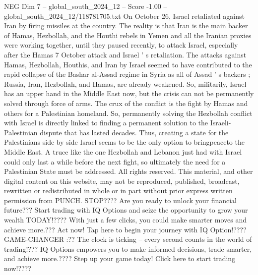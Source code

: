 \begin{textsample}{NEG Dim 7 – global\_south\_2024\_12 – Score -1.00 – global\_south\_2024\_12/118781705.txt}
On October 26, Israel retaliated against Iran by firing missiles at the country.
The reality is that Iran is the main backer of Hamas, Hezbollah, and the Houthi rebels in Yemen and all the Iranian proxies were working together, until they paused recently, to attack Israel, especially after the Hamas 7 October attack and Israel ' s retaliation.
The attacks against Hamas, Hezbollah, Houthis, and Iran by Israel seemed to have contributed to the rapid collapse of the Bashar al-Assad regime in Syria as all of Assad ' s backers ; Russia, Iran, Hezbollah, and Hamas, are already weakened.
So, militarily, Israel has an upper hand in the Middle East now, but the crisis can not be permanently solved through force of arms.
The crux of the conflict is the fight by Hamas and others for a Palestinian homeland.
So, permanently solving the Hezbollah conflict with Israel is directly linked to finding a permanent solution to the Israeli-Palestinian dispute that has lasted decades.
Thus, creating a state for the Palestinians side by side Israel seems to be the only option to bringpeaceto the Middle East.
A truce like the one Hezbollah and Lebanon just had with Israel could only last a while before the next fight, so ultimately the need for a Palestinian State must be addressed.
All rights reserved.
This material, and other digital content on this website, may not be reproduced, published, broadcast, rewritten or redistributed in whole or in part without prior express written permission from PUNCH.
STOP????
Are you ready to unlock your financial future???
Start trading with IQ Options and seize the opportunity to grow your wealth TODAY!????
With just a few clicks, you could make smarter moves and achieve more.???
Act now!
Tap here to begin your journey with IQ Option!????
GAME-CHANGER :??
The clock is ticking -- every second counts in the world of trading!???
IQ Options empowers you to make informed decisions, trade smarter, and achieve more.????
Step up your game today!
Click here to start trading now!????

\end{textsample}
